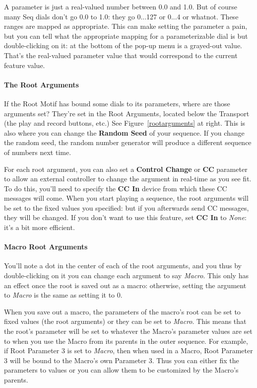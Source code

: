 \documentclass[twoside,10pt]{article}
\begin{document}
A parameter is just a real-valued number between 0.0 and 1.0.  But of course many Seq dials don't go 0.0 to 1.0: they go 0...127 or 0...4 or whatnot.  These ranges are mapped  as appropriate.  This can make setting the parameter a pain, but you can tell what the appropriate mapping for a parameterizable dial is but double-clicking on it: at the bottom of the pop-up menu is a grayed-out value. That's the real-valued parameter value that would correspond to the current feature value.    


\paragraph{The Root Arguments}  If the Root Motif has bound some dials to its parameters, where are those arguments set?  They're set in the Root Arguments, located below the Transport (the play and record buttons, etc.)  See Figure~\ref{rootarguments} at right.  This is also where you can change the {\bf Random Seed} of your sequence.  If you change the random seed, the random number generator will produce a different sequence of numbers next time.

For each root argument, you can also set a {\bf Control Change} or {\bf CC} parameter to allow an external controller to change the argument in real-time as you see fit.  To do this, you'll need to specify the {\bf CC In} device from which these CC messages will come.  When you start playing a sequence, the root arguments will be set to the fixed values you specified: but if you afterwards send CC messages, they will be changed.  If you don't want to use this feature, set  {\bf CC In} to {\it None}: it's a bit more efficient.

\paragraph{Macro Root Arguments} You'll note a dot in the center of each of the root arguments, and you thus by double-clicking on it you can change each argument to say {\it Macro}.  This only has an effect once the root is saved out as a macro: otherwise, setting the argument to {\it Macro} is the same as setting it to 0.

When you save out a macro, the parameters of the macro's root can be set to fixed values (the root arguments) or they can be set to {\it Macro}.  This means that the root's parameter will be set to whatever the Macro's parameter values are set to when you use the Macro from its parents in the outer sequence.  For example, if Root Parameter 3 is set to {\it Macro}, then when used in a Macro, Root Parameter 3 will be bound to the Macro's own Parameter 3.  Thus you can either fix the parameters to values or you can allow them to be customized by the Macro's parents.
\end{document}
